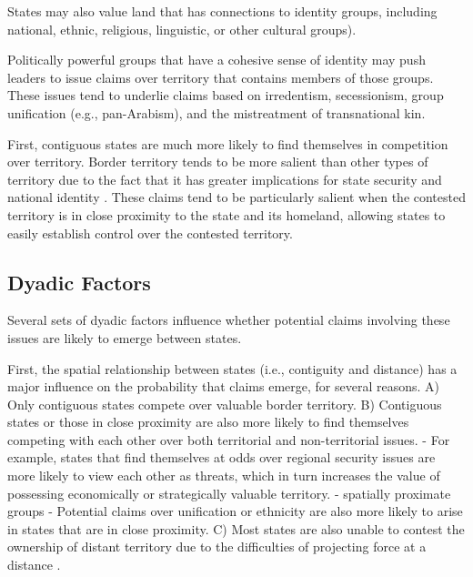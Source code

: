 States may also value land that has connections to identity groups, including national, ethnic, religious, linguistic, or other cultural groups). 

Politically powerful groups that have a cohesive sense of identity may push leaders to issue claims over territory that contains members of those groups. These issues tend to underlie claims based on irredentism, secessionism, group unification (e.g., pan-Arabism), and the mistreatment of transnational kin. 

First, contiguous states are much more likely to find themselves in competition over territory. Border territory tends to be more salient than other types of territory due to the fact that it has greater implications for state security and national identity \citep[e.g.,][]{hensel2001}. 
These claims tend to be particularly salient when the contested territory is in close proximity to the state and its homeland, allowing states to easily establish control over the contested territory. %


\subsection{Dyadic Factors}
Several sets of dyadic factors influence whether potential claims involving these issues are likely to emerge between states. 

First, the spatial relationship between states (i.e., contiguity and distance) has a major influence on the probability that claims emerge, for several reasons. 
A) Only contiguous states compete over valuable border territory.
B) Contiguous states or those in close proximity are also more likely to find themselves competing with each other over both territorial and non-territorial issues. 
	- For example, states that find themselves at odds over regional security issues are more likely to view each other as threats, which in turn increases the value of possessing economically or strategically valuable territory.
	- spatially proximate groups
	- Potential claims over unification or ethnicity are also more likely to arise in states that are in close proximity.
C) Most states are also unable to contest the ownership of distant territory due to the difficulties of projecting force at a distance \citep{boulding1962, lemke2002}.

